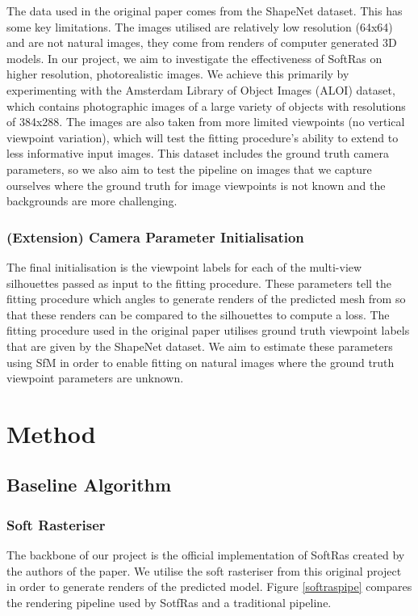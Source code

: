\documentclass{article}
\begin{document}
The data used in the original paper comes from the ShapeNet dataset. This has some key limitations. The images utilised are relatively low resolution (64x64) and are not natural images, they come from renders of computer generated 3D models. In our project, we aim to investigate the effectiveness of SoftRas on higher resolution, photorealistic images. We achieve this primarily by experimenting with the Amsterdam Library of Object Images (ALOI) \parencite{aloi} dataset, which contains photographic images of a large variety of objects with resolutions of 384x288. The images are also taken from more limited viewpoints (no vertical viewpoint variation), which will test the fitting procedure's ability to extend to less informative input images. This dataset includes the ground truth camera parameters, so we also aim to test the pipeline on images that we capture ourselves where the ground truth for image viewpoints is not known and the backgrounds are more challenging.

\subsubsection{(Extension) Camera Parameter Initialisation}

The final initialisation is the viewpoint labels for each of the multi-view silhouettes passed as input to the fitting procedure. These parameters tell the fitting procedure which angles to generate renders of the predicted mesh from so that these renders can be compared to the silhouettes to compute a loss. The fitting procedure used in the original paper utilises ground truth viewpoint labels that are given by the ShapeNet dataset. We aim to estimate these parameters using SfM in order to enable fitting on natural images where the ground truth viewpoint parameters are unknown.

\newpage
\section{Method}
\subsection{Baseline Algorithm}
\subsubsection{Soft Rasteriser}
\label{section:softraspipealgo}

The backbone of our project is the official implementation of SoftRas created by the authors of the paper. We utilise the soft rasteriser from this original project in order to generate renders of the predicted model. Figure \ref{softraspipe} compares the rendering pipeline used by SotfRas and a traditional pipeline.
\end{document}
